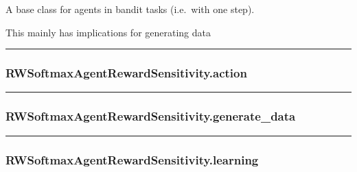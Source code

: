 A base class for agents in bandit tasks (i.e.~with one step).

This mainly has implications for generating data

\begin{center}\rule{0.5\linewidth}{\linethickness}\end{center}

\hypertarget{rwsoftmaxagentrewardsensitivity.action}{%
\subsubsection{RWSoftmaxAgentRewardSensitivity.action}\label{rwsoftmaxagentrewardsensitivity.action}}

\begin{Shaded}
\begin{Highlighting}[]
\end{Highlighting}
\end{Shaded}

\begin{center}\rule{0.5\linewidth}{\linethickness}\end{center}

\hypertarget{rwsoftmaxagentrewardsensitivity.generate_data}{%
\subsubsection{RWSoftmaxAgentRewardSensitivity.generate\_data}\label{rwsoftmaxagentrewardsensitivity.generate_data}}

\begin{Shaded}
\begin{Highlighting}[]
\end{Highlighting}
\end{Shaded}

\begin{center}\rule{0.5\linewidth}{\linethickness}\end{center}

\hypertarget{rwsoftmaxagentrewardsensitivity.learning}{%
\subsubsection{RWSoftmaxAgentRewardSensitivity.learning}\label{rwsoftmaxagentrewardsensitivity.learning}}

\begin{Shaded}
\begin{Highlighting}[]
\end{Highlighting}
\end{Shaded}

